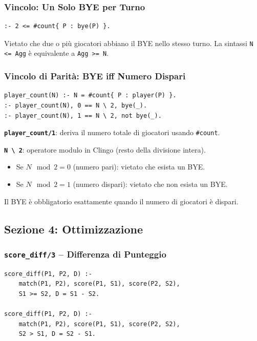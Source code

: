 \documentclass[12pt,a4paper]{article}
\begin{document}
\subsubsection{Vincolo: Un Solo BYE per Turno}

\begin{lstlisting}
:- 2 <= #count{ P : bye(P) }.
\end{lstlisting}

Vietato che due o più giocatori abbiano il BYE nello stesso turno. La sintassi
\texttt{N \textless= Agg} è equivalente a \texttt{Agg \textgreater= N}.

\subsubsection{Vincolo di Parità: BYE iff Numero Dispari}

\begin{lstlisting}
player_count(N) :- N = #count{ P : player(P) }.
:- player_count(N), 0 == N \ 2, bye(_).
:- player_count(N), 1 == N \ 2, not bye(_).
\end{lstlisting}

\textbf{\texttt{player\_count/1}}: deriva il numero totale di giocatori usando
\texttt{\#count}.

\textbf{\texttt{N \textbackslash{} 2}}: operatore modulo in Clingo (resto della
divisione intera).

\begin{itemize}[noitemsep]
  \item Se $N \mod 2 = 0$ (numero pari): vietato che esista un BYE.
  \item Se $N \mod 2 = 1$ (numero dispari): vietato che non esista un BYE.
\end{itemize}

Il BYE è obbligatorio esattamente quando il numero di giocatori è dispari.

\subsection{Sezione 4: Ottimizzazione}

\subsubsection{\texttt{score\_diff/3} -- Differenza di Punteggio}

\begin{lstlisting}
score_diff(P1, P2, D) :-
    match(P1, P2), score(P1, S1), score(P2, S2),
    S1 >= S2, D = S1 - S2.

score_diff(P1, P2, D) :-
    match(P1, P2), score(P1, S1), score(P2, S2),
    S2 > S1, D = S2 - S1.
\end{lstlisting}
\end{document}
